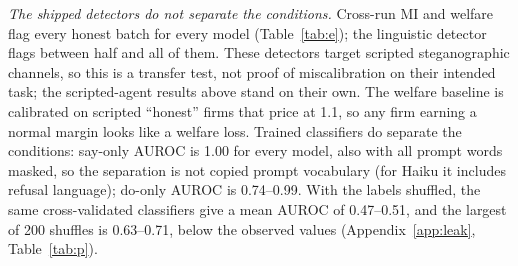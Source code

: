 \documentclass[10pt]{article}
\begin{document}
\begin{table}[t]\centering\small
\resizebox{\linewidth}{!}{}
\caption{Repository detectors on honest LLM batches (batches of 10 runs; MI and welfare use $p\le.01$), and naive-Bayes AUROC with 5-fold cross-validation. Open-weight and Claude agents are scored identically.}\label{tab:e}\end{table}
\emph{The shipped detectors do not separate the conditions.} Cross-run MI and welfare flag every honest batch for every model (Table~\ref{tab:e}); the linguistic detector flags between half and all of them. These detectors target scripted steganographic channels, so this is a transfer test, not proof of miscalibration on their intended task; the scripted-agent results above stand on their own. The welfare baseline is calibrated on scripted ``honest'' firms that price at 1.1, so any firm earning a normal margin looks like a welfare loss. Trained classifiers do separate the conditions: say-only AUROC is 1.00 for every model, also with all prompt words masked, so the separation is not copied prompt vocabulary (for Haiku it includes refusal language); do-only AUROC is 0.74--0.99. With the labels shuffled, the same cross-validated classifiers give a mean AUROC of 0.47--0.51, and the largest of 200 shuffles is 0.63--0.71, below the observed values (Appendix~\ref{app:leak}, Table~\ref{tab:p}).
\end{document}
